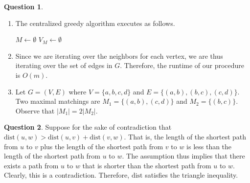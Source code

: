 \documentclass{amsart}
\theoremstyle{definition}
\newtheorem{question}{Question}
\newcommand{\dist}{\text{dist}}
\begin{document}
\begin{question}
  \begin{enumerate}[label={(\alph*)}]
    \item The centralized greedy algorithm executes as follows.
      \begin{algorithm}[h]
        \DontPrintSemicolon%
        $M \gets \emptyset$\;
        $V_M \gets \emptyset$ 
      \end{algorithm}
    \item Since we are iterating over the neighbors for each vertex, we are thus
      iterating over the set of edges in $G$. Therefore, the runtime of our
      procedure is $O(m)$.
    \item Let $G = (V, E)$ where $V = \{a, b, c, d\}$ and $E = \{(a,b), (b,c),
      (c,d)\}$. Two maximal matchings are $M_1 = \{(a,b), (c,d)\}$ and $M_2 =
      \{(b,c)\}$. Observe that $|M_1| = 2 |M_2|$.
  \end{enumerate}
\end{question}

\begin{question}
  Suppose for the sake of contradiction that $\dist(u, w) > \dist(u, v) +
  \dist(v, w)$. That is, the length of the shortest path from $u$ to $v$ plus
  the length of the shortest path from $v$ to $w$ is less than the length of the
  shortest path from $u$ to $w$. The assumption thus implies that there exists a
  path from $u$ to $w$ that is shorter than the shortest path from $u$ to $w$.
  Clearly, this is a contradiction. Therefore, $\dist$ satisfies the triangle
  inequality.
\end{question}
\end{document}
